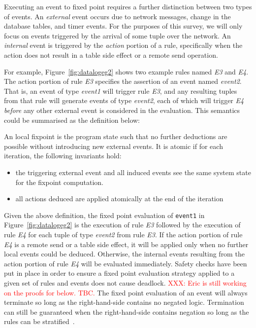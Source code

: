 \documentclass{vldb}
\newenvironment{definition}[1][Definition]{\begin{trivlist}
\item[\hskip \labelsep {\bfseries #1}]}{\end{trivlist}}
\begin{document}
Executing an event to fixed point requires a further distinction between two types
of events. 
An {\em external} event occurs due to network messages, change in the database tables, 
and timer events.  
For the purposes
of this survey, we will only focus on events triggered by the arrival of some
tuple over the network.  An {\em internal} event is triggered by the {\em action}
portion of a rule, specifically when the action does not result in a table side effect
or a remote send operation.  

For example, Figure~\ref{fig:datalogeg2} shows two example 
rules named {\em E3} and {\em E4}.  The action portion of rule {\em E3} specifies 
the assertion of an event named {\em event2}. That is, an event of type {\em event1} 
will trigger rule {\em E3}, and any resulting tuples from that rule will generate events of 
type {\em event2}, each of which will trigger {\em E4}
\emph{before} any other external event is considered in the evaluation.
This semantics could be summarised as the definition below:

\begin{definition}[Definition (Atomic Local Fixpoint)]
	An local fixpoint is the program state such that no further deductions
	are possible without introducing new external events.
	It is atomic if for each iteration, the following invariants hold:
	\begin{itemize}
		\item the triggering external event and all induced events 
			see the same system state for the fixpoint computation.
		\item all actions deduced are applied atomically at the end
			of the iteration
	\end{itemize}
\end{definition}

Given the above definition, the fixed point evaluation of {\tt event1} in
Figure~\ref{fig:datalogeg2} is the execution of rule {\em E3} followed 
by the execution of rule {\em E4} for each tuple of type {\em event2} from
rule {\em E3}.  
If the action portion of rule {\em E4} is a remote send or
a table side effect, it will be applied only when no further local events
could be deduced. 
Otherwise, the
internal events resulting from the action portion of rule {\em E4} will be
evaluated immediately.  
Safety checks have been put in place in order to ensure a fixed point evaluation
strategy applied to a given set of rules and events does not cause deadlock.
\textcolor{red}{XXX: Eric is still working on the proofs for below. TBC.}
The fixed point evaluation of an event will always
terminate so long as the right-hand-side contains no negated logic.  Termination
can still be guaranteed when the right-hand-side contains negation so
long as the rules can be stratified~\cite{loo-sigmod06}. 
\end{document}
